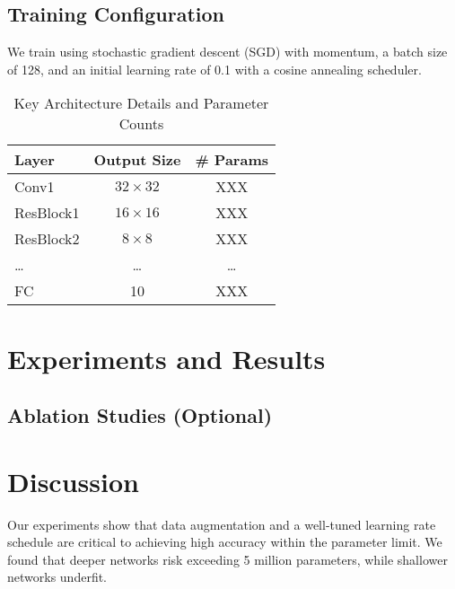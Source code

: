 \documentclass[letterpaper]{article}
\begin{document}
\subsection{Training Configuration}
We train using stochastic gradient descent (SGD) with momentum, a batch size of 128, and an initial learning rate of 0.1 with a cosine annealing scheduler.

\begin{table}[ht]
\centering
\caption{Key Architecture Details and Parameter Counts}
\label{tab:model-params}
\begin{tabular}{lcc}
\toprule
Layer & Output Size & \# Params \\
\midrule
Conv1 & $32 \times 32$ & XXX \\
ResBlock1 & $16 \times 16$ & XXX \\
ResBlock2 & $8 \times 8$   & XXX \\
\ldots & \ldots & \ldots \\
FC & 10 & XXX \\
\bottomrule
\end{tabular}
\end{table}

\section{Experiments and Results}

\subsection{Ablation Studies (Optional)}

\section{Discussion}
Our experiments show that data augmentation and a well-tuned learning rate schedule are critical to achieving high accuracy within the parameter limit. We found that deeper networks risk exceeding 5 million parameters, while shallower networks underfit.
\end{document}
